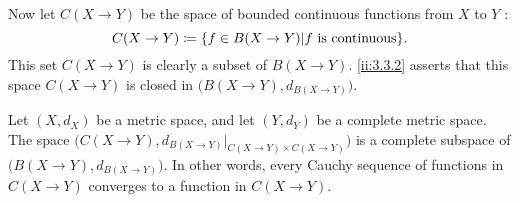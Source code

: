 \begin{note}
  Now let \(C(X \to Y)\) be the space of bounded continuous functions from \(X\) to \(Y\) :
  \[
    C(X \to Y) \coloneqq \set{f \in B(X \to Y) | f \text{ is continuous}}.
  \]
  This set \(C(X \to Y)\) is clearly a subset of \(B(X \to Y)\).
  \cref{ii:3.3.2} asserts that this space \(C(X \to Y)\) is closed in \(\big(B(X \to Y), d_{B(X \to Y)}\big)\).
\end{note}

\begin{thm}\label{ii:3.4.5}
  Let \((X, d_X)\) be a metric space, and let \((Y, d_Y)\) be a complete metric space.
  The space \(\big(C(X \to Y), d_{B(X \to Y)}|_{C(X \to Y) \times C(X \to Y)}\big)\) is a complete subspace of \(\big(B(X \to Y), d_{B(X \to Y)}\big)\).
  In other words, every Cauchy sequence of functions in \(C(X \to Y)\) converges to a function in \(C(X \to Y)\).
\end{thm}


